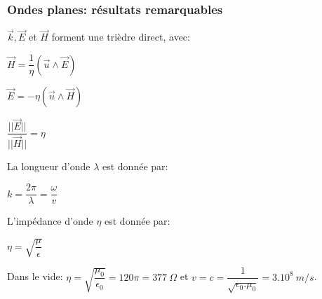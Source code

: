 \documentclass[
10pt,
aspectratio=169,
]{beamer}
\begin{document}
\begin{frame}
\frametitle{Ondes planes: résultats remarquables}

$\vec{k}, \vec{E}$ et $\vec{H}$ forment une trièdre direct, avec:

\begin{minipage}[t]{0.45\textwidth}
\center\begin{tcolorbox}[colframe=red,width=4cm]
\center$\vec{H}=\dfrac{1}{\eta}(\vec{u}\wedge\vec{E})$

$\vec{E}=-\eta(\vec{u}\wedge\vec{H})$
\end{tcolorbox}
\end{minipage}
\hfill %
\begin{minipage}[t]{0.45\textwidth}
\begin{tcolorbox}[colframe=red,width=4cm]
\center$\dfrac{||\vec{E}||}{||\vec{H}||}=\eta$
\end{tcolorbox}
\end{minipage}

\begin{minipage}[t]{0.45\textwidth}
\vspace{-0.9cm}La longueur d'onde $\lambda$ est donnée par:
\end{minipage}
\begin{minipage}[t]{0.35\textwidth}
\begin{tcolorbox}[colframe=red,width=4cm]
\center$k=\dfrac{2\pi}{\lambda}=\dfrac{\omega}{v}$
\end{tcolorbox}
\end{minipage}

\begin{minipage}[t]{0.45\textwidth}
\vspace{-0.9cm}L'impédance d'onde $\eta$ est donnée par:
\end{minipage}
\begin{minipage}[t]{0.35\textwidth}
\begin{tcolorbox}[colframe=red,width=4cm]
\center$\eta=\sqrt{\dfrac{\mu}{\epsilon}}$
\end{tcolorbox}
\end{minipage}

Dans le vide: $\eta=\sqrt{\dfrac{\mu_0}{\epsilon_0}} = 120 \pi = 377\ \Omega$ et $v=c=\dfrac{1}{\sqrt{\epsilon_0 . \mu_0}}=3.10^8\ m/s$.

\end{frame}

\end{document}
